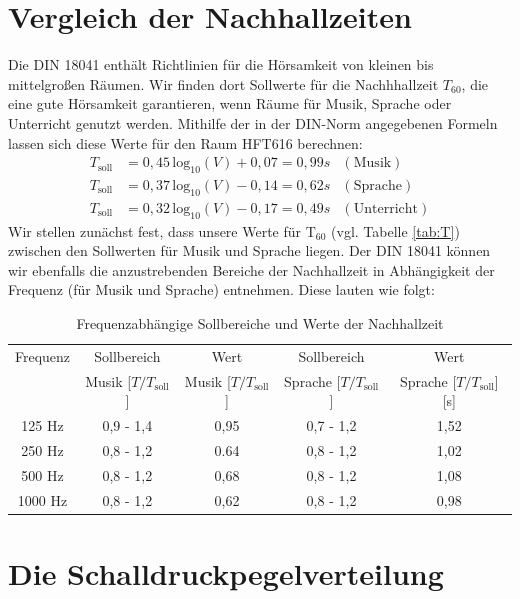 \section{Vergleich der Nachhallzeiten}
\label{sec:ts}
Die DIN 18041 \cite{DIN_18041} enthält Richtlinien für die Hörsamkeit von kleinen bis mittelgroßen Räumen. 
Wir finden dort Sollwerte für die Nachhhallzeit $T_{60}$, die eine gute Hörsamkeit garantieren, wenn Räume für Musik, Sprache oder Unterricht genutzt werden.
Mithilfe der in der DIN-Norm angegebenen Formeln lassen sich diese Werte für den Raum HFT616 berechnen:
\begin{align*}
T_{\mathrm{soll}} &= 0,45\, \mathrm{log}_{10} (V)+0,07 = 0,99 s & \mathrm{(Musik)}\\
T_{\mathrm{soll}} &= 0,37\, \mathrm{log}_{10} (V)-0,14 = 0,62 s & \mathrm{(Sprache)} \\
T_{\mathrm{soll}} &= 0,32\, \mathrm{log}_{10} (V)-0,17 = 0,49 s& \mathrm{(Unterricht)}
\end{align*}
Wir stellen zunächst fest, dass unsere Werte für T$_60$ (vgl. Tabelle \ref{tab:T}) zwischen den Sollwerten für Musik und Sprache liegen. 
Der DIN 18041 können wir ebenfalls die anzustrebenden Bereiche der Nachhallzeit in Abhängigkeit der Frequenz (für Musik und Sprache) entnehmen. Diese lauten wie folgt:
\begin{table}[H]
    \centering
    \caption{Frequenzabhängige Sollbereiche und Werte der Nachhallzeit}
    \label{tab:Tsoll}
    \begin{tabular}[\textwidth]{|c|c|c|c|c|}
    \hline
        Frequenz & Sollbereich& Wert&Sollbereich &Wert\\
        & Musik [$T/T_{\mathrm{soll}}$] & Musik [$T/T_{\mathrm{soll}}$] & Sprache [$T/T_{\mathrm{soll}}$]  & Sprache [$T/T_{\mathrm{soll}}$] [s] \\
        \hline
        125 Hz &0,9 - 1,4 & 0,95 &0,7 - 1,2  & 1,52  \\
        250 Hz &0,8 - 1,2 & 0.64 &0,8 - 1,2 & 1,02 \\
        500 Hz &0,8 - 1,2 &0,68 &0,8 - 1,2 &1,08 \\
        1000 Hz & 0,8 - 1,2 & 0,62& 0,8 - 1,2& 0,98 \\
        \hline
    \end{tabular}
\end{table}


\section{Die Schalldruckpegelverteilung}
\label{sec:sdpv}